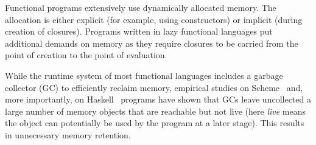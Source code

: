 \documentclass[9pt]{sigplanconf}
\begin{document}
Functional programs extensively use dynamically allocated memory.  The
allocation  is either  explicit (for  example, using  constructors) or
implicit  (during creation  of  closures).  Programs  written in  lazy
functional languages put additional  demands on memory as they require
closures to  be carried  from the  point of creation  to the  point of
evaluation.

While  the runtime  system  of most  functional  languages includes  a
garbage  collector  (GC)  to  efficiently  reclaim  memory,  empirical
studies on Scheme~\cite{karkare06effectiveness} and, more importantly,
on Haskell~\cite{rojemo96lag}
programs have shown that  GCs leave uncollected a large
number of  memory objects that are  reachable but not  live (here {\em
  live} means the  object can potentially be used by  the program at a
later stage).  This results in unnecessary memory retention.

\end{document}
